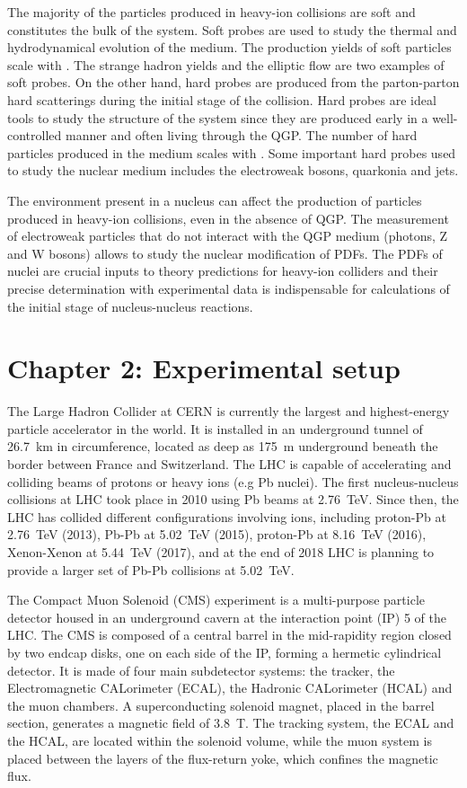The majority of the particles produced in heavy-ion collisions are soft and constitutes the bulk of the system. Soft probes are used to study the thermal and hydrodynamical evolution of the medium. The production yields of soft particles scale with \npart. The strange hadron yields and the elliptic flow are two examples of soft probes. On the other hand, hard probes are produced from the parton-parton hard scatterings during the initial stage of the collision. Hard probes are ideal tools to study the structure of the system since they are produced early in a well-controlled manner and often living through the QGP. The number of hard particles produced in the medium scales with \ncoll. Some important hard probes used to study the nuclear medium includes the electroweak bosons, quarkonia and jets. 

The environment present in a nucleus can affect the production of particles produced in heavy-ion collisions, even in the absence of QGP. The measurement of electroweak particles that do not interact with the QGP medium (photons, Z and W bosons) allows to study the nuclear modification of PDFs. The PDFs of nuclei are crucial inputs to theory predictions for heavy-ion colliders and their precise determination with experimental data is indispensable for calculations of the initial stage of nucleus-nucleus reactions.


\section{Chapter 2: Experimental setup}

The Large Hadron Collider at CERN is currently the largest and highest-energy particle accelerator in the world. It is installed in an underground tunnel of \SI{26.7}{\km} in circumference, located as deep as \SI{175}{\m} underground beneath the border between France and Switzerland. The LHC is capable of accelerating and colliding beams of protons or heavy ions (e.g Pb nuclei). The first nucleus-nucleus collisions at LHC took place in 2010 using Pb beams at \SI{2.76}{\TeV}. Since then, the LHC has collided different configurations involving ions, including proton-Pb at \SI{2.76}{\TeV} (2013), Pb-Pb at 5.02~TeV (2015), proton-Pb at \SI{8.16}{\TeV} (2016), Xenon-Xenon at \SI{5.44}{\TeV} (2017), and at the end of 2018 LHC is planning to provide a larger set of Pb-Pb collisions at \SI{5.02}{\TeV}.

The Compact Muon Solenoid (CMS) experiment is a multi-purpose particle detector housed in an underground cavern at the interaction point (IP) 5 of the LHC. The CMS is composed of a central barrel in the mid-rapidity region closed by two endcap disks, one on each side of the IP, forming a hermetic cylindrical detector. It is made of four main subdetector systems: the tracker, the Electromagnetic CALorimeter (ECAL), the Hadronic CALorimeter (HCAL) and the muon chambers. A superconducting solenoid magnet, placed in the barrel section, generates a magnetic field of \SI{3.8}{\tesla}. The tracking system, the ECAL and the HCAL, are located within the solenoid volume, while the muon system is placed between the layers of the flux-return yoke, which confines the magnetic flux.

